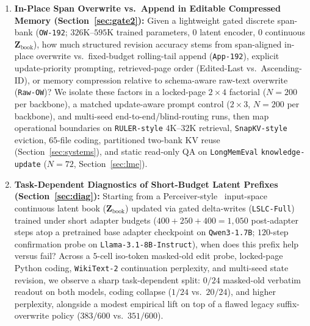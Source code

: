 \documentclass[10pt]{article}
\newcommand{\vect}[1]{\mathbf{#1}}
\renewcommand{\_}{\origunderscore\allowbreak}
\begin{document}
\begin{enumerate}
    \item \textbf{In-Place Span Overwrite vs.\ Append in Editable Compressed Memory (Section~\ref{sec:gate2}):} Given a lightweight gated discrete span-bank (\texttt{OW-192}; $326\text{K}$--$595\text{K}$ trained parameters, $0$ latent encoder, $0$ continuous $\vect{Z}_{\text{book}}$), how much structured revision accuracy stems from span-aligned in-place overwrite vs.\ fixed-budget rolling-tail append (\texttt{App-192}), explicit update-priority prompting, retrieved-page order (Edited-Last vs.\ Ascending-ID), or memory compression relative to schema-aware raw-text overwrite (\texttt{Raw-OW})? We isolate these factors in a locked-page $2\times 4$ factorial ($N=200$ per backbone), a matched update-aware prompt control ($2\times 3$, $N=200$ per backbone), and multi-seed end-to-end/blind-routing runs, then map operational boundaries on \texttt{RULER-style} $4\text{K}$--$32\text{K}$ retrieval, \texttt{SnapKV-style} eviction, $65$-file coding, partitioned two-bank KV reuse (Section~\ref{sec:systems}), and static read-only QA on \texttt{LongMemEval} \texttt{knowledge-update} ($N=72$, Section~\ref{sec:lme}).
    \item \textbf{Task-Dependent Diagnostics of Short-Budget Latent Prefixes (Section~\ref{sec:diag}):} Starting from a Perceiver-style~\citep{jaegle2021perceiver} input-space continuous latent book ($\vect{Z}_{\text{book}}$) updated via gated delta-writes (\texttt{LSLC-Full}) trained under short adapter budgets ($400+250+400 = 1{,}050$ post-adapter steps atop a pretrained base adapter checkpoint on \texttt{Qwen3-1.7B}; $120$-step confirmation probe on \texttt{Llama-3.1-8B-Instruct}), when does this prefix help versus fail? Across a $5$-cell iso-token masked-old edit probe, locked-page Python coding, \texttt{WikiText-2} continuation perplexity, and multi-seed state revision, we observe a sharp task-dependent split: $0/24$ masked-old verbatim readout on both models, coding collapse ($1/24$ vs.\ $20/24$), and higher perplexity, alongside a modest empirical lift on top of a flawed legacy suffix-overwrite policy ($383/600$ vs.\ $351/600$).
\end{enumerate}
\end{document}
